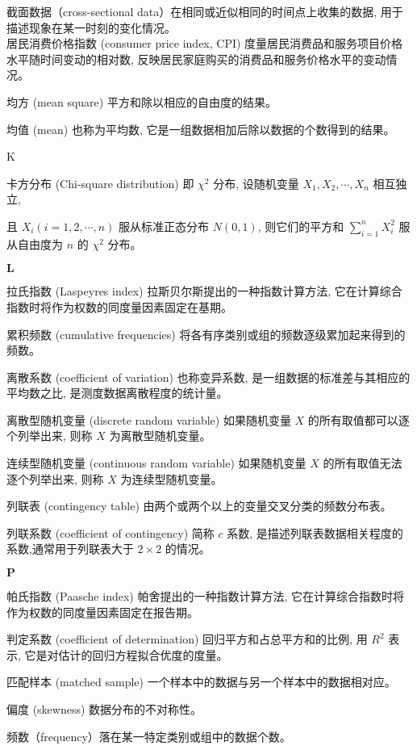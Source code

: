 \documentclass[10pt]{article}
\begin{document}
\begin{CJK*}{UTF8}{bsmi}
截面数据（cross-sectional data）在相同或近似相同的时间点上收集的数据, 用于描述现象在某一时刻的变化情况。\\
居民消费价格指数 (consumer price index, CPI) 度量居民消费品和服务项目价格水平随时间变动的相对数, 反映居民家庭购买的消费品和服务价格水平的变动情况。

均方 (mean square) 平方和除以相应的自由度的结果。

均值 (mean) 也称为平均数, 它是一组数据相加后除以数据的个数得到的结果。

K

卡方分布 (Chi-square distribution) 即 $\chi^{2}$ 分布, 设随机变量 $X_{1}, X_{2}, \cdots, X_{n}$ 相互独立,

且 $X_{i}(i=1,2, \cdots, n)$ 服从标准正态分布 $N(0,1)$, 则它们的平方和 $\sum_{i=1}^{n} X_{i}^{2}$ 服从自由度为 $n$ 的 $\chi^{2}$ 分布。

$\mathbf{L}$

拉氏指数 (Laspeyres index) 拉斯贝尔斯提出的一种指数计算方法, 它在计算综合指数时将作为权数的同度量因素固定在基期。

累积频数 (cumulative frequencies) 将各有序类别或组的频数逐级累加起来得到的频数。

离散系数 (coefficient of variation) 也称变异系数, 是一组数据的标准差与其相应的平均数之比, 是测度数据离散程度的统计量。

离散型随机变量 (discrete random variable) 如果随机变量 $X$ 的所有取值都可以逐个列举出来, 则称 $X$ 为离散型随机变量。

连续型随机变量 (continuous random variable) 如果随机变量 $X$ 的所有取值无法逐个列举出来, 则称 $X$ 为连续型随机变量。

列联表 (contingency table) 由两个或两个以上的变量交叉分类的频数分布表。

列联系数 (coefficient of contingency) 简称 $c$ 系数, 是描述列联表数据相关程度的系数,通常用于列联表大于 $2 \times 2$ 的情况。

$\mathbf{P}$

帕氏指数 (Paasche index) 帕舍提出的一种指数计算方法, 它在计算综合指数时将作为权数的同度量因素固定在报告期。

判定系数 (coefficient of determination) 回归平方和占总平方和的比例, 用 $R^{2}$ 表示, 它是对估计的回归方程拟合优度的度量。

匹配样本 (matched sample) 一个样本中的数据与另一个样本中的数据相对应。

偏度 (skewness) 数据分布的不对称性。

频数（frequency）落在某一特定类别或组中的数据个数。


\end{CJK*}
\end{document}
